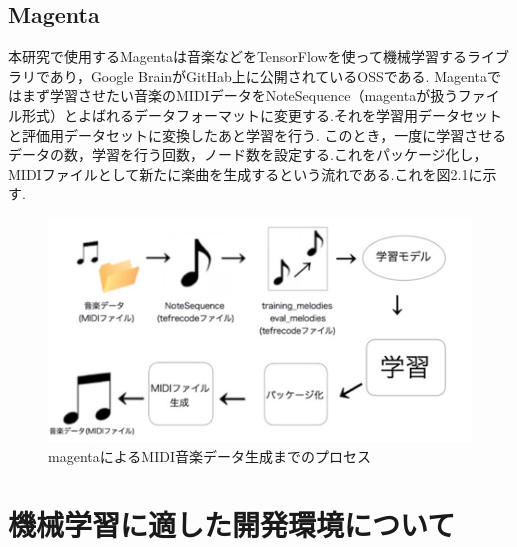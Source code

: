 \subsection{Magenta}
本研究で使用するMagentaは音楽などをTensorFlowを使って機械学習するライブラリであり，Google BrainがGitHab上に公開されているOSSである.
Magentaではまず学習させたい音楽のMIDIデータをNoteSequence（magentaが扱うファイル形式）とよばれるデータフォーマットに変更する.それを学習用データセットと評価用データセットに変換したあと学習を行う.
このとき，一度に学習させるデータの数，学習を行う回数，ノード数を設定する.これをパッケージ化し，MIDIファイルとして新たに楽曲を生成するという流れである.これを図2.1に示す.
\begin{figure}[h]
    \begin{screen}
    \begin{center}
        \includegraphics[scale=1.7, clip]{./img/magenta_usestep.png}
        \caption{magentaによるMIDI音楽データ生成までのプロセス}
        \label{fig:magentaによるMIDI音楽データ生成までのプロセス}
    \end{center}
    \end{screen}
\end{figure}
\section{機械学習に適した開発環境について}
